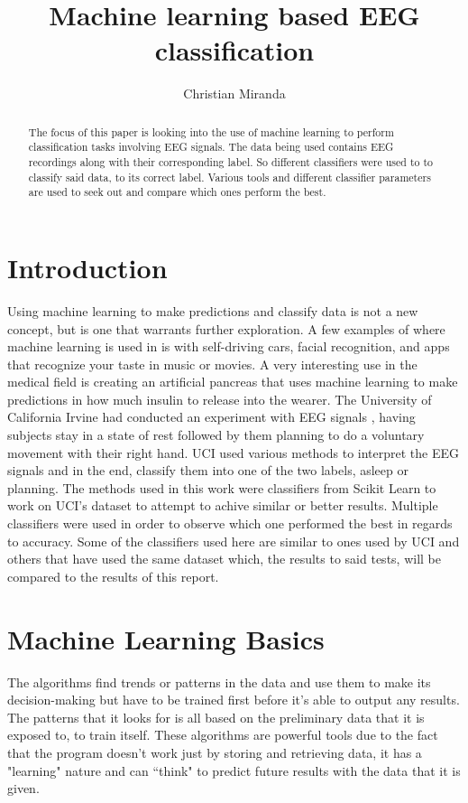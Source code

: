 \documentclass[conference,compsoc]{IEEEtran}
\begin{document}
\author{Christian Miranda}
\title{Machine learning based EEG classification}
\maketitle

\begin{abstract}
The focus of this paper is looking into the use of machine learning to perform classification tasks involving EEG signals.
The data being used contains EEG recordings along with their corresponding label. So different classifiers were used to 
to classify said data, to its correct label. Various tools and different classifier parameters are used to seek 
out and compare which ones perform the best. 
\end{abstract}

\section{Introduction}
Using machine learning to make predictions and classify data is not a new concept, but is one that warrants further exploration. 
A few examples of where machine learning is used in is with self-driving cars, facial recognition, and apps that recognize your taste in music or movies. 
A very interesting use in the medical field is creating an artificial pancreas that uses machine learning \cite{diabetes} to make predictions in how much insulin to 
release into the wearer.
The University of California Irvine had conducted an experiment with EEG signals \cite{classsvm}, having subjects stay in a state of rest followed by them planning to do a voluntary movement with their right hand. 
UCI used various methods to interpret the EEG signals and in the end, classify them into one of the two labels, asleep or planning. The methods used in this work were classifiers from Scikit Learn to work on UCI's dataset to attempt to achive similar or better results. Multiple classifiers were used in order to observe which one performed the best in regards 
to accuracy. Some of the classifiers used here are similar to ones used by UCI and others that have used the same dataset \cite{fuzzy} which, the results to said tests, will be compared to the results of this report.

\section{Machine Learning Basics}
The algorithms find trends or patterns in the data and use them to make its decision-making but have to be trained first before it's able to output any results. 
The patterns that it looks for is all based on the preliminary data that it is exposed to, to train itself. These algorithms are powerful tools due to the fact that 
the program doesn't work just by storing and retrieving data, it has a "learning" nature and can ``think" to predict future results with the data that it is given.
\end{document}
